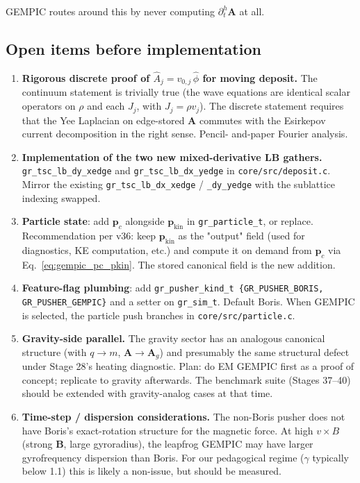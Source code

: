 \documentclass[11pt,a4paper]{article}
\newcommand{\vv}[1]{\mathbf{#1}}
\begin{document}
GEMPIC routes around this by never computing
$\partial^h_t\vv{A}$ at all.

\subsection{Open items before implementation}

\begin{enumerate}
  \item \textbf{Rigorous discrete proof of
    $\hat{A}_j = v_{0,j}\,\hat{\phi}$ for moving deposit.}
    The continuum statement is trivially true (the wave equations
    are identical scalar operators on $\rho$ and each $J_j$, with
    $J_j = \rho v_j$).  The discrete statement requires that the
    Yee Laplacian on edge-stored $\vv{A}$ commutes with the
    Esirkepov current decomposition in the right sense.  Pencil-
    and-paper Fourier analysis.
  \item \textbf{Implementation of the two new mixed-derivative LB
    gathers.}  \texttt{gr\_tsc\_lb\_dy\_xedge} and
    \texttt{gr\_tsc\_lb\_dx\_yedge} in
    \texttt{core/src/deposit.c}.  Mirror the existing
    \texttt{gr\_tsc\_lb\_dx\_xedge} / \texttt{\_dy\_yedge} with the
    sublattice indexing swapped.
  \item \textbf{Particle state}: add $\vv{p}_c$ alongside
    $\vv{p}_{\mathrm{kin}}$ in \texttt{gr\_particle\_t}, or replace.
    Recommendation per v36: keep $\vv{p}_{\mathrm{kin}}$ as the
    "output" field (used for diagnostics, KE computation, etc.) and
    compute it on demand from $\vv{p}_c$ via Eq.~\eqref{eq:gempic_pc_pkin}.
    The stored canonical field is the new addition.
  \item \textbf{Feature-flag plumbing}: add
    \texttt{gr\_pusher\_kind\_t \{GR\_PUSHER\_BORIS, GR\_PUSHER\_GEMPIC\}}
    and a setter on \texttt{gr\_sim\_t}.  Default Boris.  When GEMPIC
    is selected, the particle push branches in
    \texttt{core/src/particle.c}.
  \item \textbf{Gravity-side parallel.}  The gravity sector has an
    analogous canonical structure (with $q \to m$, $\vv{A} \to
    \vv{A}_g$) and presumably the same structural defect under
    Stage 28's heating diagnostic.  Plan: do EM GEMPIC first as a
    proof of concept; replicate to gravity afterwards.  The
    benchmark suite (Stages 37--40) should be extended with
    gravity-analog cases at that time.
  \item \textbf{Time-step / dispersion considerations.}
    The non-Boris pusher does not have Boris's exact-rotation
    structure for the magnetic force.  At high $v\times B$
    (strong $\vv{B}$, large gyroradius), the leapfrog GEMPIC may
    have larger gyrofrequency dispersion than Boris.  For our
    pedagogical regime ($\gamma$ typically below 1.1) this is
    likely a non-issue, but should be measured.
\end{enumerate}
\end{document}
